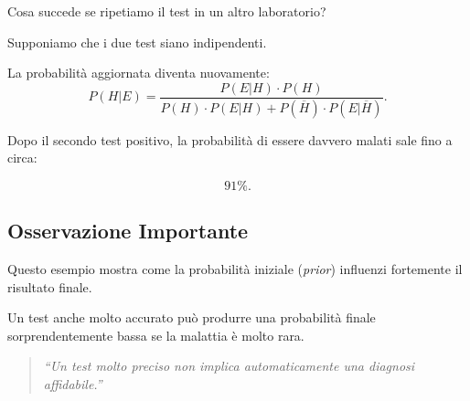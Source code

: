 Cosa succede se ripetiamo il test in un altro laboratorio?

Supponiamo che i due test siano indipendenti.

La probabilità aggiornata diventa nuovamente:
\[
P(H|E) = \frac{P(E|H)\cdot P(H)}{P(H)\cdot P(E|H) + P(\overline{H})\cdot P(E|\overline{H})}.
\]

Dopo il secondo test positivo, la probabilità di essere davvero malati sale fino a circa:

\[
\boxed{91\%}.
\]

\subsection{Osservazione Importante}

Questo esempio mostra come la probabilità iniziale (\textit{prior}) influenzi fortemente il risultato finale.

Un test anche molto accurato può produrre una probabilità finale sorprendentemente bassa se la malattia è molto rara.

\begin{quote}
\textit{``Un test molto preciso non implica automaticamente una diagnosi affidabile.''}
\end{quote}